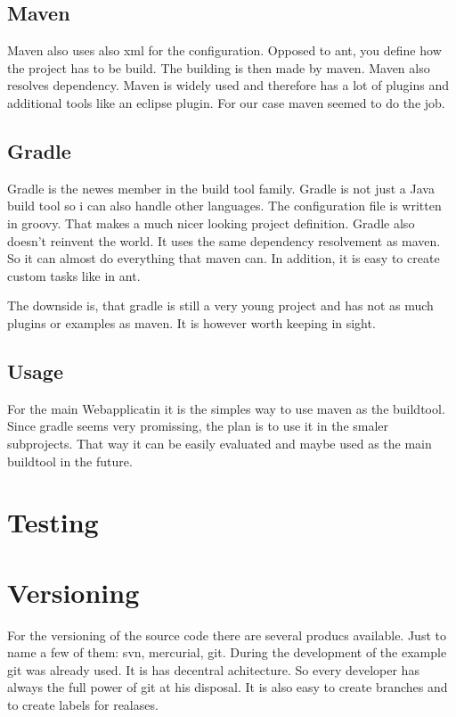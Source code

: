\documentclass[paper=a4,twoside=false,BCOR=0mm,DIV=calc,fontsize=12pt]{scrartcl}
\begin{document}
\subsection{Maven}
Maven also uses also xml for the configuration. Opposed to ant, you define how the project has to be build. The building is then
made by maven. Maven also resolves dependency. Maven is widely used and therefore has a lot of plugins and additional tools like an eclipse plugin. For our case maven seemed to do the job.


\subsection{Gradle}
Gradle is the newes member in the build tool family. Gradle is not just a Java build tool so i can also handle other languages. The configuration file is written in groovy. That makes a much nicer looking project definition.
Gradle also doesn't reinvent the world. It uses the same dependency resolvement as maven. So it can almost do everything that maven can. In addition, it is easy to create custom tasks like in ant.

The downside is, that gradle is still a very young project and has not as much plugins or examples as maven. It is however worth keeping in sight.

\subsection{Usage}
For the main Webapplicatin it is the simples way to use maven as the buildtool. Since gradle seems very promissing, the plan is to use it in the smaler subprojects. That way it can be easily evaluated and maybe used as the main buildtool in the future.


\section{Testing}

\section{Versioning}
For the versioning of the source code there are several producs available. Just to name a few of them: svn, mercurial, git.
During the development of the example git was already used. It is has decentral achitecture. So every developer has always the full power of git at his disposal. It is also easy to create branches and to create labels for realases.
\end{document}
